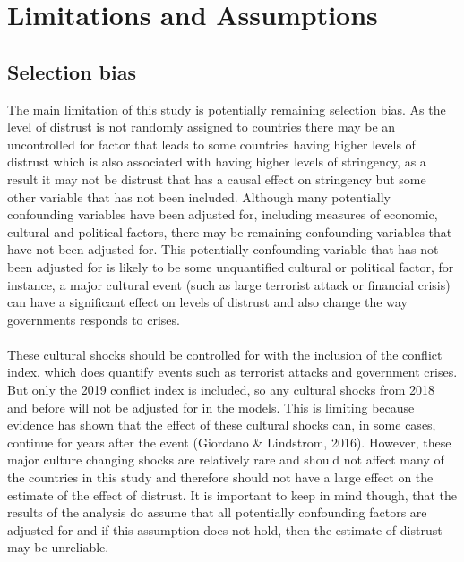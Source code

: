 \documentclass[
  12pt,
]{article}
\begin{document}
\hypertarget{limitations-and-assumptions}{%
\section{Limitations and Assumptions}\label{limitations-and-assumptions}}

\hypertarget{selection-bias}{%
\subsection{Selection bias}\label{selection-bias}}

The main limitation of this study is potentially remaining selection bias. As the level of distrust is not randomly assigned to countries there may be an uncontrolled for factor that leads to some countries having higher levels of distrust which is also associated with having higher levels of stringency, as a result it may not be distrust that has a causal effect on stringency but some other variable that has not been included. Although many potentially confounding variables have been adjusted for, including measures of economic, cultural and political factors, there may be remaining confounding variables that have not been adjusted for. This potentially confounding variable that has not been adjusted for is likely to be some unquantified cultural or political factor, for instance, a major cultural event (such as large terrorist attack or financial crisis) can have a significant effect on levels of distrust and also change the way governments responds to crises.\\
~\\
These cultural shocks should be controlled for with the inclusion of the conflict index, which does quantify events such as terrorist attacks and government crises. But only the 2019 conflict index is included, so any cultural shocks from 2018 and before will not be adjusted for in the models. This is limiting because evidence has shown that the effect of these cultural shocks can, in some cases, continue for years after the event (Giordano \& Lindstrom, 2016). However, these major culture changing shocks are relatively rare and should not affect many of the countries in this study and therefore should not have a large effect on the estimate of the effect of distrust. It is important to keep in mind though, that the results of the analysis do assume that all potentially confounding factors are adjusted for and if this assumption does not hold, then the estimate of distrust may be unreliable.\\
\end{document}
